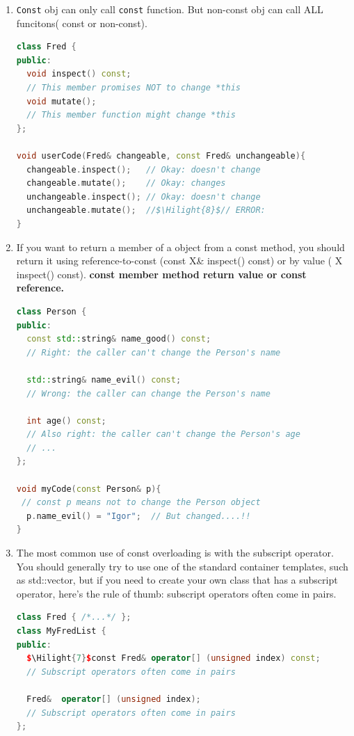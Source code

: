 \documentclass[a4paper,12pt,twoside]{book}
\newcommand{\Hilight}[1]{\makebox[0pt][l]{\color{yellow}\rule[-3pt]{#1em}{11pt}}}
\begin{document}
\begin{itemize}
\begin{enumerate}
\item \texttt{Const} obj can only call \texttt{const} function. But non-const obj can call ALL funcitons( const or non-const).
\begin{lstlisting}[frame=single, language=c++, mathescape=true]
class Fred {
public:
  void inspect() const;
  // This member promises NOT to change *this
  void mutate();
  // This member function might change *this
};

void userCode(Fred& changeable, const Fred& unchangeable){
  changeable.inspect();   // Okay: doesn't change
  changeable.mutate();    // Okay: changes
  unchangeable.inspect(); // Okay: doesn't change
  unchangeable.mutate();  //$\Hilight{8}$// ERROR:
}
\end{lstlisting}

\item If you want to return a member of a object from a const method, you should return it using reference-to-const (const X\& inspect() const) or by value ( X inspect() const). \textbf{const member method return value or const reference.}
\begin{lstlisting}[frame=single, language=c++]
class Person {
public:
  const std::string& name_good() const;
  // Right: the caller can't change the Person's name

  std::string& name_evil() const;
  // Wrong: the caller can change the Person's name

  int age() const;
  // Also right: the caller can't change the Person's age
  // ...
};

void myCode(const Person& p){
 // const p means not to change the Person object
  p.name_evil() = "Igor";  // But changed....!!
}
\end{lstlisting}

\item The most common use of const overloading is with the subscript operator. You should generally try to use one of the standard container templates, such as std::vector, but if you need to create your own class that has a subscript operator, here's the rule of thumb: subscript operators often come in pairs.
\begin{lstlisting}[frame=single, language=c++, mathescape=true]
class Fred { /*...*/ };
class MyFredList {
public:
  $\Hilight{7}$const Fred& operator[] (unsigned index) const;
  // Subscript operators often come in pairs

  Fred&  operator[] (unsigned index);
  // Subscript operators often come in pairs
};
\end{lstlisting}



\end{enumerate}
\end{itemize}
\end{document}
